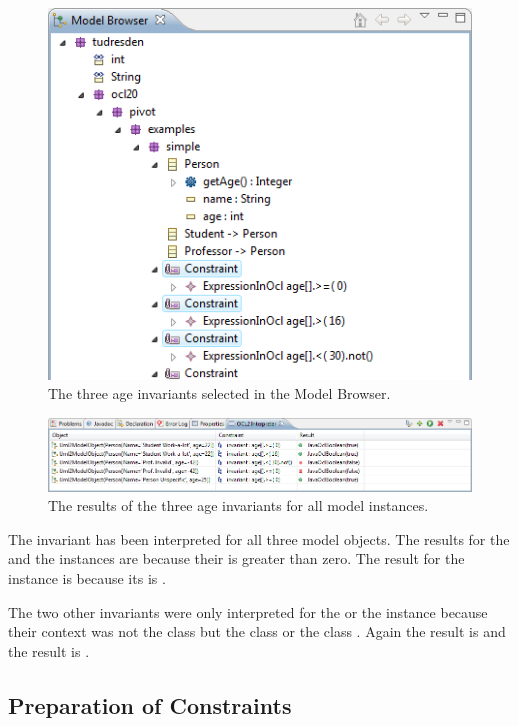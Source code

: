 \begin{figure}[!htbp]
	\centering
	\includegraphics[width=0.7\linewidth]{figures/interpreter/interpret03}
	\caption{The three age invariants selected in the Model Browser.}
	\label{pic:interpret:interpret03}
\end{figure}

\begin{figure}[!htbp]
	\centering
	\includegraphics[width=1.0\linewidth]{figures/interpreter/interpret04}
	\caption{The results of the three age invariants for all model instances.}
	\label{pic:interpret:interpret04}
\end{figure}

The invariant  has been interpreted for all three model objects. The results for the  and the  instances are  because their  is greater than zero. The result for the  instance is  because its  is .

The two other invariants were only interpreted for the  or the  instance because their context was not the class  but the class  or the class . Again the  result is  and the  result is .


\subsection{Preparation of Constraints}

